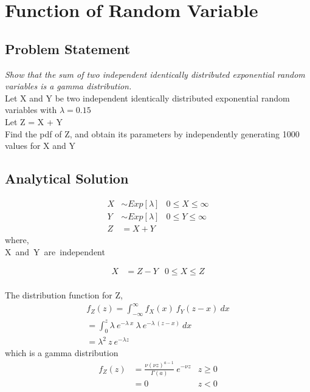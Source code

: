 \chapter{Function of Random Variable}

\section{Problem Statement} 

\textit{Show that the sum of two independent identically distributed exponential random variables is a gamma distribution.} \\


Let X and Y be two independent identically distributed exponential random variables with $\lambda=0.15$ \\
Let Z = X + Y \\
Find the pdf of Z, and obtain its parameters by independently generating 1000 values for X and Y

\section{Analytical Solution} 

\begin{align*} 
X &\sim Exp[\lambda]		 &		0 \le X \le \infty \\ 
Y &\sim Exp[\lambda]		 &		0 \le Y \le \infty \\ 
Z &= X + Y		 		&		%
\end{align*}
where, \\
X~and~Y~are~independent


\begin{align*} 
X &= Z - Y		 &		0 \le X \le Z \\
\end{align*}

The distribution function for Z, 
\begin{align*} 
f_{Z}(z)	=	\int_{-\infty}^{\infty} f_{X}(x) ~ f_{Y}(z-x) ~ dx \\
			=	\int_{0}^{z} \lambda ~ e^{-\lambda~x} ~ \lambda ~ e^{-\lambda~(z-x)} ~ dx \\
			= \lambda ^2	~	z	~	e^{-\lambda z}
\end{align*}
which is a gamma distribution \\
\begin{align*} 
f_Z(z)&=\frac{\nu(\nu z)^{a-1}}{\Gamma(a)} ~ e^{-\nu z} &  z \ge 0 \\
&=0 	& 	z < 0
\end{align*}

